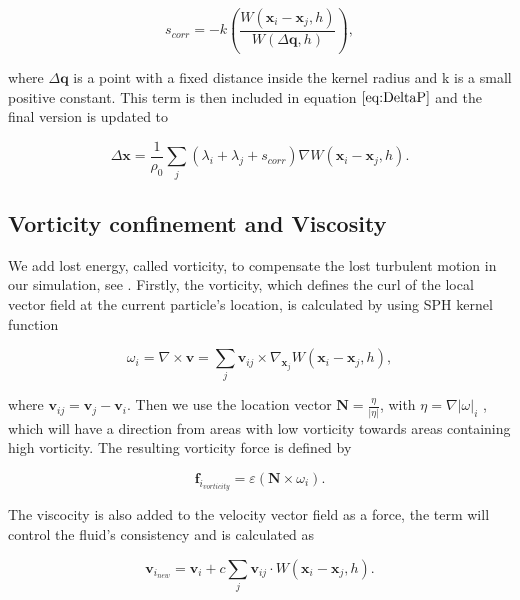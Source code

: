 \begin{equation}
\label{eq:Scorr}
s_{corr} = -k \left( \frac{W(\mathbf{x}_i - \mathbf{x}_j, h)}{W(\Delta \mathbf{q}, h)} \right),
\end{equation}

where $\Delta \mathbf{q}$ is a point with a fixed distance inside the kernel
radius and k is a small positive constant. This term is then included in
equation $\ref{eq:DeltaP}$ and the final version is updated to

\begin{equation}
\label{eq:DeltaPscorr}
\Delta \mathbf{x} = \frac{1}{\rho_0} \sum\limits_{j} (\lambda_i + \lambda_j + s_{corr}) \nabla W(\mathbf{x}_i - \mathbf{x}_j, h).
\end{equation}

\subsection{Vorticity confinement and Viscosity} We add lost energy, called
vorticity, to compensate the lost turbulent motion in our simulation, see
\cite{macklin2013position}.  Firstly, the vorticity, which defines the curl of
the local vector field at the current particle's location, is calculated by
using SPH kernel function

\begin{equation}
\label{eq:Omega}
\omega_{i} = \nabla \times \mathbf{v} =  \sum\limits_{j} \mathbf{v}_{ij} \times \nabla_{\mathbf{x}_{j}} W(\mathbf{x}_{i} - \mathbf{x}_{j}, h),
\end{equation}

where $\mathbf{v}_{ij} = \mathbf{v}_{j} - \mathbf{v}_{i}$. Then we use the
location vector $\mathbf{N} = \frac{\eta}{|\eta|}$, with $\eta =
\nabla|\omega|_{i}$ , which will have a direction from areas with low vorticity
towards areas containing high vorticity. The resulting vorticity force is
defined by

\begin{equation}
\label{eq:Vorticity}
\mathbf{f}_{i_{vorticity}} = \varepsilon \left(\mathbf{N} \times \omega_{i} \right).
\end{equation}

The viscocity is also added to the velocity vector field as a force, the term
will control the fluid's consistency and is calculated as

\begin{equation}
\label{eq:Viscosity}
\mathbf{v}_{i_{new}} = \mathbf{v}_{i} + c \sum\limits_{j} \mathbf{v}_{ij} \cdot W(\mathbf{x}_i - \mathbf{x}_j, h).
\end{equation}

